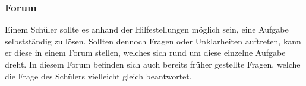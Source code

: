 \subsubsection*{Forum}
Einem Schüler sollte es anhand der Hilfestellungen möglich sein, eine Aufgabe selbstständig zu lösen. Sollten dennoch Fragen oder Unklarheiten auftreten, kann er diese in einem Forum stellen, welches sich rund um diese einzelne Aufgabe dreht. In diesem Forum befinden sich auch bereits früher gestellte Fragen, welche die Frage des Schülers vielleicht gleich beantwortet.


\newpage